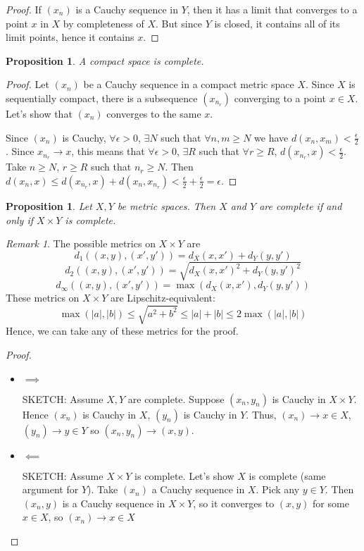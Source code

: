 \documentclass{article}
\theoremstyle{definition}
\theoremstyle{plain}%
\newtheorem{prop}[thm]{Proposition}
\theoremstyle{remark}
\newtheorem*{rem}{Remark}
\begin{document}
\begin{proof}
     If $(x_n)$ is a Cauchy sequence in $Y$, then it has a limit that converges to a point $x$ in $X$ by completeness of $X$. But since $Y$ is closed, it contains all of its limit points, hence it contains $x$.
\end{proof}

\begin{prop}
    A compact space is complete.
\end{prop}

\begin{proof}
     Let $(x_n)$ be a Cauchy sequence in a compact metric space $X$. Since $X$ is sequentially compact, there is a subsequence $(x_{n_r})$ converging to a point $x \in X$. Let's show that $(x_n)$ converges to the same $x$.
     
     Since $(x_n)$ is Cauchy, $\forall \epsilon > 0$, $\exists N$ such that $\forall n, m \ge N$ we have $d(x_n, x_m) < \frac{\epsilon}{2}$. Since $x_{n_r} \to x$, this means that $\forall \epsilon > 0$, $\exists R$ such that $\forall r \ge R$, $d(x_{n_r}, x) < \frac{\epsilon}{2}$. Take $n \ge N$, $r \ge R$ such that $n_r \ge N$. Then $d(x_n, x) \le d(x_{n_r}, x) + d(x_n, x_{n_r}) < \frac{\epsilon}{2} + \frac{\epsilon}{2} = \epsilon$.
\end{proof}

\begin{prop}
    Let $X, Y$ be metric spaces. Then $X$ and $Y$ are complete if and only if $X \times Y$ is complete.
\end{prop}

\begin{rem}
   The possible metrics on $X \times Y$ are \[d_1((x,y), (x',y')) = d_X(x,x') + d_Y(y, y')\]
   \[d_2((x,y),(x',y')) = \sqrt{d_X(x,x')^2 + d_Y(y,y')^2}\]
   \[d_\infty((x,y),(x',y')) = \max{(d_X(x,x'), d_Y(y,y'))}\]
   These metrics on $X \times Y$ are Lipschitz-equivalent:
   \[\max(|a|, |b|) \le \sqrt{a^2+b^2} \le |a| + |b| \le 2\max(|a|, |b|)\]
   Hence, we can take any of these metrics for the proof.
\end{rem}

\begin{proof}
     \begin{itemize}
         \item $\implies$
         
         SKETCH: Assume $X,Y$ are complete. Suppose $(x_n, y_n)$ is Cauchy in $X \times Y$. Hence $(x_n)$ is Cauchy in $X$, $(y_n)$ is Cauchy in $Y$. Thus, $(x_n) \to x \in X$, $(y_n) \to y \in Y$ so $(x_n, y_n) \to (x,y)$. 
         
         \item $\impliedby$
         
         SKETCH: Assume $X \times Y$ is complete. Let's show $X$ is complete (same argument for $Y$). Take $(x_n)$ a Cauchy sequence in $X$. Pick any $y \in Y$. Then $(x_n, y)$ is a Cauchy sequence in $X \times Y$, so it converges to $(x,y)$ for some $x \in X$, so $(x_n) \to x \in X$
     \end{itemize}
\end{proof}
\end{document}
